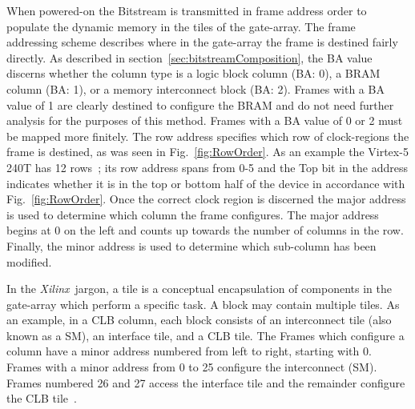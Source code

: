 \documentclass[conference]{IEEEtran}
\newcommand{\Xilinx}{\textit{\gls{Xilinx}}~}
\begin{document}
When powered-on the \gls{Bitstream} is transmitted in frame address order to populate the dynamic memory in the tiles of the gate-array.
The frame addressing scheme describes where in the gate-array the frame is destined fairly directly.
As described in section~\ref{sec:bitstreamComposition}, the \acrfull{BA} value discerns whether the column type is a logic block column (BA: 0), a \acrfull{BRAM} column (BA: 1), or a memory interconnect block (BA: 2).
Frames with a \acrshort{BA} value of 1 are clearly destined to configure the \acrshort{BRAM} and do not need further analysis for the purposes of this method.
Frames with a \acrshort{BA} value of 0 or 2 must be mapped more finitely.
The row address specifies which row of clock-regions the frame is destined, as was seen in Fig.~\ref{fig:RowOrder}.
As an example the Virtex-5 240T has 12 rows~\cite{virtex5ConfigGuide}; its row address spans from 0-5 and the Top bit in the address indicates whether it is in the top or bottom half of the device in accordance with Fig.~\ref{fig:RowOrder}.
Once the correct clock region is discerned the major address is used to determine which column the frame configures.
The major address begins at 0 on the left and counts up towards the number of columns in the row.
Finally, the minor address is used to determine which sub-column has been modified.

In the \Xilinx jargon, a tile is a conceptual encapsulation of components in the gate-array which perform a specific task.
A block may contain multiple tiles.
As an example, in a \acrfull{CLB} column, each block consists of an interconnect tile (also known as a \acrfull{SM}), an interface tile, and a \acrshort{CLB} tile.
The Frames which configure a column have a minor address numbered from left to right, starting with 0. 
Frames with a minor address from 0 to 25 configure the interconnect (\acrshort{SM}).
Frames numbered 26 and 27 access the interface tile and the remainder configure the \acrshort{CLB} tile~\cite{virtex5ConfigGuide}.
\end{document}
